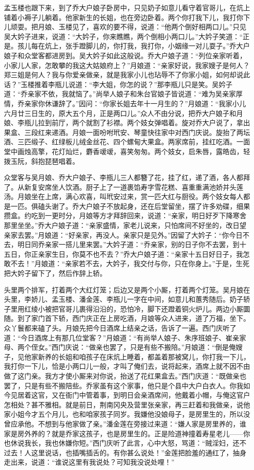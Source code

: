 孟玉楼也跟下来，到了乔大户娘子卧房中，只见奶子如意儿看守着官哥儿，在炕上铺着小褥子儿躺着。他家新生的长姐，也在旁边卧着。两个你打我下儿，我打你下儿顽耍。把月娘、玉楼见了，喜欢的要不得，说道：“他两个倒好相两口儿。”只见吴大妗子进来，说道：“大妗子，你来瞧瞧，两个倒相小两口儿。”大妗子笑道：“正是。孩儿每在炕上，张手蹬脚儿的，你打我，我打你，小姻缘一对儿耍子。”乔大户娘子和众堂客都进房到。吴大妗子如此这般说。乔大户娘子道：“列位亲家听着，小家儿人家，怎敢攀的我这大姑娘府上？”月娘道：“亲家好说，我家嫂子是何人？郑三姐是何人？我与你爱亲做亲，就是我家小儿也玷辱不了你家小姐，如何却说此话？”玉楼推着李瓶儿说道：“李大姐，你怎的说？”那李瓶儿只是笑。吴妗子道：“乔亲家不依，我就恼了。”尚举人娘子和朱台官娘子皆说道：“难为吴亲家厚情，乔亲家你休谦辞了。”因问：“你家长姐去年十一月生的？”月娘道：“我家小儿六月廿三日生的，原大五个月，正是两口儿。”众人不由分说，把乔大户娘子和月娘、李瓶儿拉到前厅，两个就割了衫襟。两个妓女弹唱着。旋对乔大户说了，拿出果盒、三段红来递酒。月娘一面吩咐玳安、琴童快往家中对西门庆说。旋抬了两坛酒、三匹缎子、红绿板儿绒金丝花、四个螺甸大果盒。两家席前，挂红吃酒。一面堂中画烛高擎，花灯灿烂，麝香叆叆，喜笑匆匆。两个妓女，启朱唇，露皓齿，轻拨玉阮，斜抱琵琶唱着。

众堂客与吴月娘、乔大户娘子、李瓶儿三人都簪了花，挂了红，递了酒，各人都拜了。从新复安席坐人饮酒。厨子上了一道裹馅寿字雪花糕、喜重重满池娇并头莲汤。月娘坐在上席，满心欢喜，叫玳安过来，赏一匹大红与厨役。两个妓女每人都是一匹。俱磕头谢了。乔大户娘子不放起身，还在后堂留坐，摆了许多劝碟，细果攒盒。约吃到一更时分，月娘等方才拜辞回来，说道：“亲家，明日好歹下降寒舍那里坐坐。”乔大户娘子道：“亲家盛情，家老儿说来，只怕席间不好坐的，改日望亲家去罢。”月娘道：“好亲家，再没人。亲家只是见外。”因留了大妗子：“你今日不去，明日同乔亲家一搭儿里来罢。”大妗子道：“乔亲家，别的日子你不去罢，到十五日，你正亲家生日，你莫不也不去？”乔大户娘子道：“亲家十五日好日子，我怎敢不去！”月娘道：“亲家若不去，大妗子，我交付与你，只在你身上。”于是，生死把大妗子留下了，然后作辞上轿。

头里两个排军，打着两个大红灯笼；后边又是两个小厮，打着两个灯笼。吴月娘在头里，李娇儿、孟玉楼、潘金莲、李瓶儿一字在中间，如意儿和蕙秀随后。奶子轿子里用红绫小被把官哥儿裹得沿沿的，恐怕冷，脚下还蹬着铜火炉儿。两边小厮圜随。到了家门首下轿，西门庆正在上房吃酒，月娘等众人进来，道了万福，坐下。众丫鬟都来磕了头。月娘先把今日酒席上结亲之话，告诉了一遍。西门庆听了道：“今日酒席上有那几位堂客？”月娘道：“有尚举人娘子、朱序班娘子、崔亲家母、两个侄女。”西门庆说：“做亲也罢了，只是有些不搬陪。”月娘道：“倒是俺嫂子，见他家新养的长姐和咱孩子在床炕上睡着，都盖着那被窝儿，你打我一下儿，我打你一下儿，恰是小两口儿一般，才叫了俺们去，说将起来，酒席上就不因不由做了这门亲。我方才使小厮来对你说，抬送了花红果盒去。”西门庆道：“既做亲也罢了，只是有些不搬陪些。乔家虽有这个家事，他只是个县中大户白衣人。你我如今见居着这官，又在衙门中管着事，到明日会亲酒席间，他戴着小帽，与俺这官户怎相处？甚不雅相。就是前日，荆南冈央及营里张亲家，再三赶着和我做亲，说他家小姐今才五个月儿，也和咱家孩子同岁。我嫌他没娘母子，是房里生的，所以没曾应承他。不想到与他家做了亲。”潘金莲在旁接过来道：“嫌人家是房里养的，谁家是房外养的？就是乔家这孩子，也是房里生的。正是险道神撞着寿星老儿——你也休说我长，我也休嫌你短。”西门庆听了此言，心中大怒，骂道：“贼淫妇，还不过去！人这里说话，也插嘴插舌的。有你甚么说处！”金莲把脸羞的通红了，抽身走出来，说道：“谁说这里有我说处？可知我没说处哩！”

